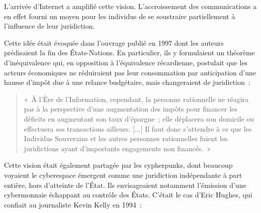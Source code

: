 L'arrivée d'Internet a amplifié cette vision. L'accroissement des communications a en effet fourni un moyen pour les individus de se soustraire partiellement à l'influence de leur juridiction.

Cette idée était évoquée dans l'ouvrage  publié en 1997 dont les auteurs prédisaient la fin des États-Nations. En particulier, ils y formulaient un théorème d'inéquivalence qui, en opposition à l'équivalence récardienne, postulait que les acteurs économiques ne réduiraient pas leur consommation par anticipation d'une hausse d'impôt due à une relance budgétaire, mais changeraient de juridiction~:

\begin{quote}
«~À l'Ère de l'Information, cependant, la personne rationnelle ne réagira pas à la perspective d'une augmentation des impôts pour financer les déficits en augmentant son taux d'épargne~; elle déplacera son domicile ou effectuera ses transactions ailleurs. [...] Il faut donc s'attendre à ce que les Individus Souverains et les autres personnes rationnelles fuient les juridictions ayant d'importants engagements non financés.~»
\end{quote} %

Cette vision était également partagée par les cypherpunks, dont beaucoup voyaient le cyberespace émergent comme une juridiction indépendante à part entière, hors d'atteinte de l'État. Ils envisageaient notamment l'émission d'une cybermonnaie échappant au contrôle des États. C'était le cas d'Eric Hughes, qui confiait au journaliste Kevin Kelly en 1994~:

